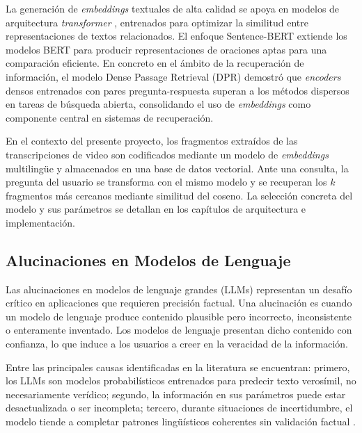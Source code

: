 La generación de \textit{embeddings} textuales de alta calidad se apoya en modelos de arquitectura \textit{transformer} \cite{vaswani2017attention}, entrenados para optimizar la similitud entre representaciones de textos relacionados. El enfoque Sentence-BERT \cite{reimers2019sbert} extiende los modelos BERT para producir representaciones de oraciones aptas para una comparación eficiente. En concreto en el ámbito de la recuperación de información, el modelo Dense Passage Retrieval (DPR) \cite{karpukhin2020dense} demostró que \textit{encoders} densos entrenados con pares pregunta-respuesta superan a los métodos dispersos en tareas de búsqueda abierta, consolidando el uso de \textit{embeddings} como componente central en sistemas de recuperación.

En el contexto del presente proyecto, los fragmentos extraídos de las transcripciones de video son codificados mediante un modelo de \textit{embeddings} multilingüe y almacenados en una base de datos vectorial. Ante una consulta, la pregunta del usuario se transforma con el mismo modelo y se recuperan los $k$ fragmentos más cercanos mediante similitud del coseno. La selección concreta del modelo y sus parámetros se detallan en los capítulos de arquitectura e implementación.


\subsection{Alucinaciones en Modelos de Lenguaje}
\label{subsection:2-Alucinaciones en Modelos de Lenguaje}

Las alucinaciones en modelos de lenguaje grandes (LLMs) representan un desafío crítico en aplicaciones que requieren precisión factual. Una alucinación es cuando un modelo de lenguaje produce contenido plausible pero incorrecto, inconsistente o enteramente inventado. Los modelos de lenguaje presentan dicho contenido con confianza, lo que induce a los usuarios a creer en la veracidad de la información.

Entre las principales causas identificadas en la literatura se encuentran: primero, los LLMs son modelos probabilísticos entrenados para predecir texto verosímil, no necesariamente verídico; segundo, la información en sus parámetros puede estar desactualizada o ser incompleta; tercero, durante situaciones de incertidumbre, el modelo tiende a completar patrones lingüísticos coherentes sin validación factual \cite{Hallucinations_in_LLMs}.

